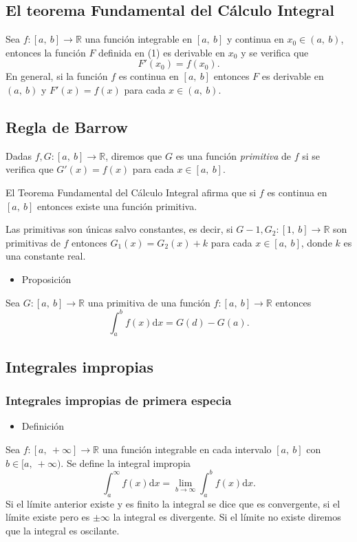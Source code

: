 \subsection{El teorema Fundamental del Cálculo Integral}
Sea $f:[a,~b]\rightarrow\mathbb{R}$ una función integrable en $[a,~b]$ y continua en $x_0\in(a,~b)$, entonces la función $F$ definida en (1) es derivable en $x_0$ y se verifica que \[ F'(x_0)=f(x_0). \]
En general, si la función $f$ es continua en $[a,~b]$ entonces $F$ es derivable en $(a,~b)$ y $F'(x)=f(x)$ para cada $x\in(a,~b)$.
\subsection{Regla de Barrow}
Dadas $f,G:[a,~b]\rightarrow\mathbb{R}$, diremos que $G$ es una función \textit{primitiva} de $f$ si se verifica que $G'(x)=f(x)$ para cada $x\in[a,~b]$.

El Teorema Fundamental del Cálculo Integral afirma que si $f$ es continua en $[a,~b]$ entonces existe una función primitiva.

Las primitivas son únicas salvo constantes, es decir, si $G-1,G_2:[1,~b]\rightarrow\mathbb{R}$ son primitivas de $f$ entonces $G_1(x)=G_2(x)+k$ para cada $x\in[a,~b]$, donde $k$ es una constante real.
\begin{itemize}[label=\color{red}\textbullet, leftmargin=*]
	\item \color{lightblue}Proposición
\end{itemize}
Sea $G:[a,~b]\rightarrow\mathbb{R}$ una primitiva de una función $f:[a,~b]\rightarrow\mathbb{R}$ entonces \[ \int_a^bf(x)\mathrm{d}x=G(d)-G(a). \]
\subsection{Integrales impropias}
\subsubsection{Integrales impropias de primera especia}
\begin{itemize}[label=\color{red}\textbullet, leftmargin=*]
	\item \color{lightblue}Definición 
\end{itemize}
Sea $f:[a,~+\infty]\rightarrow\mathbb{R}$ una función integrable en cada intervalo $[a,~b]$ con $b\in[a,~+\infty)$. Se define la integral impropia \[ \int_a^\infty f(x)\mathrm{d}x =\lim_{b\to\infty}\int_a^bf(x)\mathrm{d}x.\]
Si el límite anterior existe y es finito la integral se dice que es convergente, si el límite existe pero es $\pm\infty$ la integral es divergente. Si el límite no existe diremos que la integral es oscilante.

